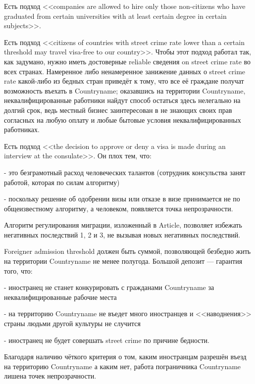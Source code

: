\documentclass[11pt]{article}
\theoremstyle{remark}
\theoremstyle{definition}
\begin{document}
Есть подход <<companies are allowed to hire only those non-citizens who have graduated from certain universities with at least certain degree in certain subjects>>. 



Есть подход <<citizens of countries with street crime rate lower than a certain threshold may travel visa-free to our country>>. Чтобы этот подход работал так, как задумано, нужно иметь достоверные reliable сведения on street crime rate во всех странах. Намеренное либо ненамеренное занижение данных о street crime rate какой-либо из бедных стран приведёт к тому, что все её граждане получат возможность въехать в Countryname; оказавшись на территории Countryname, неквалифицированные работники найдут способ остаться здесь нелегально на долгий срок, ведь местный бизнес заинтересован в не знающих своих прав согласных на любую оплату и любые бытовые условия неквалифицированных работниках. 


Есть подход <<the decision to approve or deny a visa is made during an interview at the consulate>>. Он плох тем, что:

- это безграмотный расход человеческих талантов (сотрудник консульства занят работой, которая по силам алгоритму)

- поскольку решение об одобрении визы или отказе в визе принимается не по общеизвестному алгоритму, а человеком, появляется точка непрозрачности. 



Алгоритм регулирования миграции, изложенный в Article, позволяет избежать негативных последствий 1, 2 и 3, не вызывая новых негативных последствий.


Foreigner admission threshold должен быть суммой, позволяющей безбедно жить на территории Countryname не менее полугода. Большой депозит --- гарантия того, что:

- иностранец не станет конкурировать с гражданами Countryname за неквалифицированные рабочие места

- на территорию Countryname не въедет много иностранцев и <<наводнения>> страны людьми другой культуры не случится

- иностранец не будет совершать street crime по причине бедности.

Благодаря наличию чёткого критерия о том, каким иностранцам разрешён въезд на территорию Countryname а каким нет, работа пограничника Countryname лишена точек непрозрачности.
\end{document}
